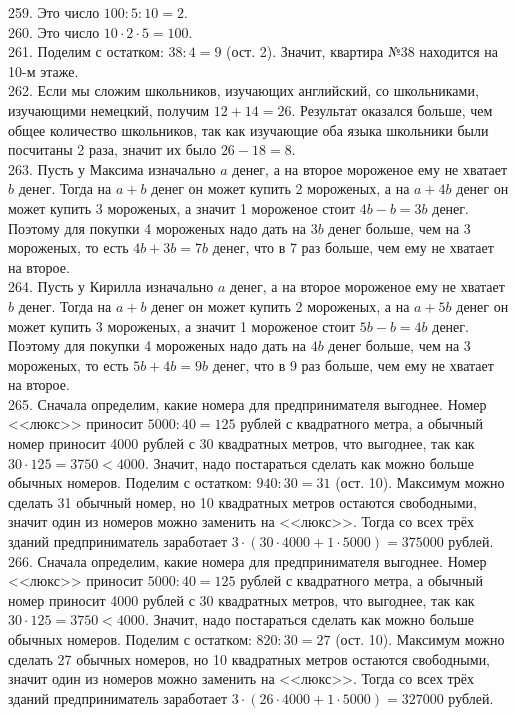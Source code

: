 259. Это число $100:5:10=2.$\\
260. Это число $10\cdot2\cdot5=100.$\\
261. Поделим с остатком: $38:4=9$ (ост. 2). Значит, квартира №38 находится на 10-м этаже.\\
262. Если мы сложим школьников, изучающих английский, со школьниками, изучающими немецкий, получим $12+14=26.$ Результат оказался больше, чем общее количество школьников, так как изучающие оба языка школьники были посчитаны 2 раза, значит их было $26-18=8.$\\
263. Пусть у Максима изначально $a$ денег, а на второе мороженое ему не хватает $b$ денег. Тогда на $a+b$ денег он может купить 2 мороженых, а на $a+4b$ денег он может купить 3 мороженых, а значит 1 мороженое стоит $4b-b=3b$ денег. Поэтому для покупки 4 мороженых надо дать на $3b$ денег больше, чем на 3 мороженых, то есть $4b+3b=7b$ денег, что в 7 раз больше, чем ему не хватает на второе.\\
264. Пусть у Кирилла изначально $a$ денег, а на второе мороженое ему не хватает $b$ денег. Тогда на $a+b$ денег он может купить 2 мороженых, а на $a+5b$ денег он может купить 3 мороженых, а значит 1 мороженое стоит $5b-b=4b$ денег. Поэтому для покупки 4 мороженых надо дать на $4b$ денег больше, чем на 3 мороженых, то есть $5b+4b=9b$ денег, что в 9 раз больше, чем ему не хватает на второе.\\
265. Сначала определим, какие номера для предпринимателя выгоднее. Номер <<люкс>> приносит $5000:40=125$ рублей с квадратного метра, а обычный номер приносит 4000 рублей с 30 квадратных метров, что выгоднее, так как $30\cdot125=3750<4000.$ Значит, надо постараться сделать как можно больше обычных номеров. Поделим с остатком: $940:30=31$ (ост. 10). Максимум можно сделать 31 обычный номер, но 10 квадратных метров остаются свободными, значит один из номеров можно заменить на <<люкс>>. Тогда со всех трёх зданий предприниматель заработает $3\cdot(30\cdot4000+1\cdot5000)=375000$ рублей.\\
266. Сначала определим, какие номера для предпринимателя выгоднее. Номер <<люкс>> приносит $5000:40=125$ рублей с квадратного метра, а обычный номер приносит 4000 рублей с 30 квадратных метров, что выгоднее, так как $30\cdot125=3750<4000.$ Значит, надо постараться сделать как можно больше обычных номеров. Поделим с остатком: $820:30=27$ (ост. 10). Максимум можно сделать 27 обычных номеров, но 10 квадратных метров остаются свободными, значит один из номеров можно заменить на <<люкс>>. Тогда со всех трёх зданий предприниматель заработает $3\cdot(26\cdot4000+1\cdot5000)=327000$ рублей.\\
